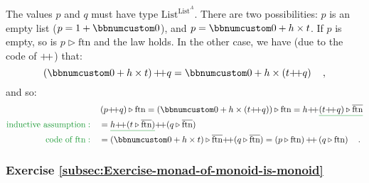 The values $p$ and $q$ must have type $\text{List}^{\text{List}^{A}}$.
There are two possibilities: $p$ is an empty list ($p=1+\bbnum 0$),
and $p=\bbnum 0+h\times t$. If $p$ is empty, so is $p\triangleright\text{ftn}$
and the law holds. In the other case, we have (due to the code of
${\displaystyle }{+\negmedspace+}$) that:
\[
\left(\bbnum 0+h\times t\right)\pplus q=\bbnum 0+h\times\left(t\pplus q\right)\quad,
\]
and so:
\begin{align*}
 & \left(p\pplus q\right)\triangleright\text{ftn}=\left(\bbnum 0+h\times\left(t\pplus q\right)\right)\triangleright\text{ftn}=h\pplus\gunderline{\left(t\pplus q\right)\triangleright\overline{\text{ftn}}}\\
{\color{greenunder}\text{inductive assumption}:}\quad & =\gunderline{h\pplus(t\triangleright\overline{\text{ftn}})}\pplus(q\triangleright\overline{\text{ftn}})\\
{\color{greenunder}\text{code of }\text{ftn}:}\quad & =\left(\bbnum 0+h\times t\right)\triangleright\overline{\text{ftn}}\pplus(q\triangleright\overline{\text{ftn}})=\left(p\triangleright\text{ftn}\right)\pplus\left(q\triangleright\text{ftn}\right)\quad.
\end{align*}


\subsubsection*{Exercise \ref{subsec:Exercise-monad-of-monoid-is-monoid}}

